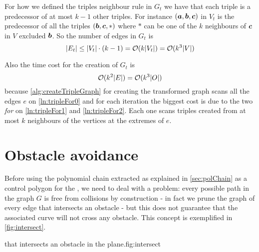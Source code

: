 \documentclass[dissertation.tex]{subfiles}
\begin{document}
For how we defined the triples neighbour rule in $G_t$ we have
that each triple is a predecessor of at most $k-1$ other triples. For
instance $(\boldsymbol{a},\boldsymbol{b},\boldsymbol{c})$ in $V_t$ is the predecessor of all the triples
$(\boldsymbol{b},\boldsymbol{c},*)$ where $*$ can be one of the $k$ neighbours
of $\boldsymbol{c}$ in $V$ excluded $\boldsymbol{b}$. So the number of edges in $G_t$ is
\begin{equation}
  \label{eq:numEdgesTriples}
  |E_t|\leq |V_t|\cdot (k-1)=\mathcal{O}(k|V_t|)=\mathcal{O}(k^3|V|)
\end{equation}

Also the time cost for the creation of $G_t$ is
\newcommand{\eqCostVt}{\ensuremath{\bigO(k^3|\obsSet|)}}
\begin{equation}
  \label{eq:costVt}
  \bigO(k^2|E|)=\eqCostVt
\end{equation}
because \cref{alg:createTripleGraph} for creating the transformed
graph scans all the edges $e$ on \cref{ln:tripleFor0} and for each
iteration
the biggest cost is due to the two \emph{for} on \cref{ln:tripleFor1} and
\cref{ln:tripleFor2}. Each one scans triples created from at most
$k$ neighbours
of the vertices at the extremes of $e$.

\section{Obstacle avoidance}\label{sec:obsAvoid}
Before using the polynomial chain extracted as
explained in \cref{sec:polChain} as a control polygon for the
\bs, we need to deal with a
problem: every possible path in the graph $G$ is
free from collisions by construction - in fact we prune the graph of
every edge that intersects an obstacle - but this does not guarantee
that the associated curve will not cross any obstacle. This concept is
exemplified in
\cref{fig:intersect}.
\begin{myfig}{\bs that intersects an obstacle in the plane.}{fig:intersect}
\end{myfig}
\end{document}
